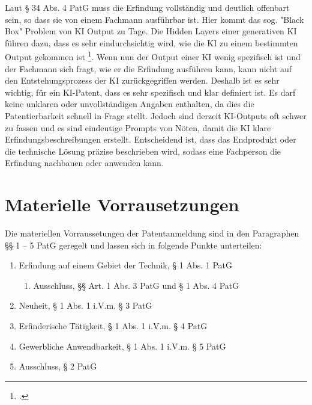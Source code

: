 Laut § 34 Abs. 4 PatG muss die Erfindung vollständig und deutlich offenbart sein, so dass
sie von einem Fachmann ausführbar ist. Hier kommt das sog. 
"Black Box" Problem von KI Output zu Tage. Die Hidden Layers einer
generativen KI führen dazu, dass es sehr eindurchsichtig wird,
wie die KI zu einem bestimmten Output gekommen ist
\footcite{pauliniKIgenerierteErfindungPatentrechtliche}. Wenn nun
der Output einer KI wenig spezifisch ist und der Fachmann sich fragt,
wie er die Erfindung ausführen kann, kann nicht auf den Entstehungsprozess
der KI zurückgegriffen werden. Deshalb ist es sehr wichtig, für ein
KI-Patent, dass es sehr spezifisch und klar definiert ist. Es darf keine
unklaren oder unvollständigen Angaben enthalten, 
da dies die Patentierbarkeit
schnell in Frage stellt. Jedoch sind derzeit KI-Outputs oft
schwer zu fassen und es sind eindeutige Prompts von Nöten,
damit die KI klare Erfindungsbeschreibungen erstellt.
Entscheidend ist, dass das Endprodukt 
oder die technische Lösung präzise beschrieben wird, 
sodass eine Fachperson die Erfindung nachbauen oder anwenden kann.
\section{Materielle Vorrausetzungen}

Die materiellen Vorraussetungen der Patentanmeldung sind 
in den Paragraphen §§ 1 – 5 PatG geregelt 
und lassen sich in folgende Punkte unterteilen:

\begin{enumerate}
    \item Erfindung auf einem Gebiet der Technik, § 1 Abs. 1 PatG
    \begin{enumerate}
    \vspace{-0.05in}
    \item Ausschluss, §§ Art. 1 Abs. 3 PatG und § 1 Abs. 4 PatG
    \end{enumerate}
    \vspace{-0.11in} 
    \item Neuheit, § 1 Abs. 1 i.V.m. § 3 PatG
    \vspace{-0.11in} 
    \item Erfinderische Tätigkeit, § 1 Abs. 1 i.V.m. § 4 PatG
    \vspace{-0.11in} 
    \item Gewerbliche Anwendbarkeit, § 1 Abs. 1 i.V.m. § 5 PatG
    \vspace{-0.11in} 
    \item Ausschluss, § 2 PatG
\end{enumerate}

